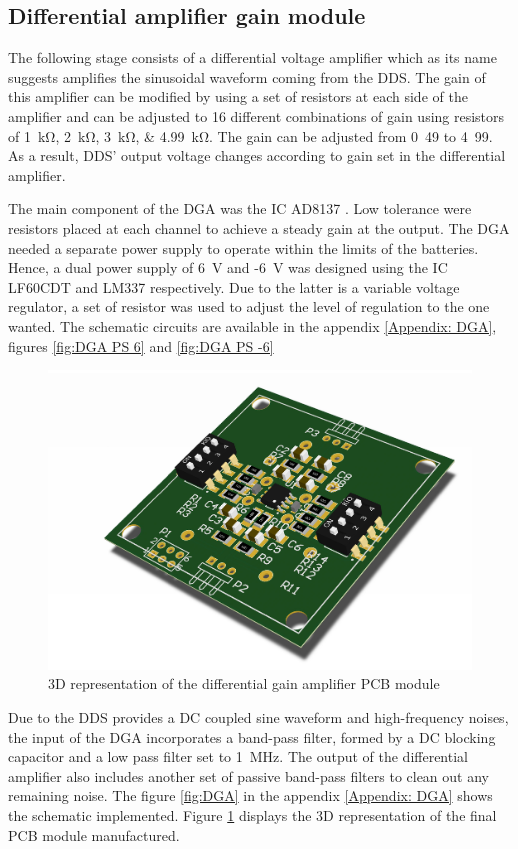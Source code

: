 \subsection{Differential amplifier gain module}
The following stage consists of a differential voltage amplifier which as its name suggests amplifies the sinusoidal waveform coming from the DDS. The gain of this amplifier can be modified by using a set of resistors at each side of the amplifier and can be adjusted to 16 different combinations of gain using resistors of \SIlist{1;2;3;4.99}{\kohm}. The gain can be adjusted from \si{0.49} to \si{4.99}. As a result, DDS’ output voltage changes according to gain set in the differential amplifier. 

The main component of the DGA was the IC AD8137 . Low tolerance were resistors placed at each channel to achieve a steady gain at the output. The DGA needed a separate power supply to operate within the limits of the batteries. Hence, a dual power supply of \SI{6}{\volt} and -\SI{6}{\volt} was designed using the IC LF60CDT and LM337 respectively. Due to the latter is a variable voltage regulator, a set of resistor was used to adjust the level of regulation to the one wanted. The schematic circuits are available in the appendix \ref{Appendix: DGA}, figures \ref{fig:DGA PS 6} and \ref{fig:DGA PS -6}

\begin{figure}[!htpb]
	\centering
	\includegraphics[width=7.5 cm,keepaspectratio]{figure_DGA}
	\caption{3D representation of the differential gain amplifier PCB module}
	\label{fig:3D DGA}
\end{figure}

Due to the DDS provides a DC coupled sine waveform and high-frequency noises, the input of the DGA incorporates a band-pass filter, formed by a DC blocking capacitor and a low pass filter set to \SI{1}{\mega\hertz}. The output of the differential amplifier also includes another set of passive band-pass filters to clean out any remaining noise. The figure \ref{fig:DGA} in the appendix \ref{Appendix: DGA} shows the schematic implemented. Figure \ref{fig:3D DGA} displays the 3D representation of the final PCB module manufactured.

